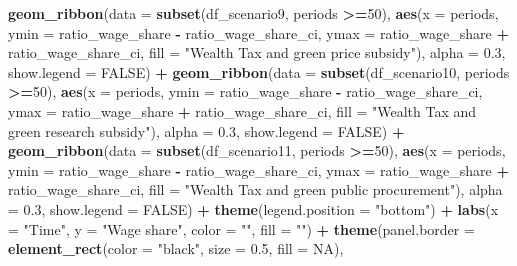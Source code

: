 \documentclass[
]{article}
\newenvironment{Shaded}{\begin{snugshade}}{\end{snugshade}}
\newcommand{\AttributeTok}[1]{\textcolor[rgb]{0.13,0.29,0.53}{#1}}
\newcommand{\ConstantTok}[1]{\textcolor[rgb]{0.56,0.35,0.01}{#1}}
\newcommand{\DecValTok}[1]{\textcolor[rgb]{0.00,0.00,0.81}{#1}}
\newcommand{\FloatTok}[1]{\textcolor[rgb]{0.00,0.00,0.81}{#1}}
\newcommand{\FunctionTok}[1]{\textcolor[rgb]{0.13,0.29,0.53}{\textbf{#1}}}
\newcommand{\NormalTok}[1]{#1}
\newcommand{\SpecialCharTok}[1]{\textcolor[rgb]{0.81,0.36,0.00}{\textbf{#1}}}
\newcommand{\StringTok}[1]{\textcolor[rgb]{0.31,0.60,0.02}{#1}}
\begin{document}
\begin{Shaded}
\begin{Highlighting}[]
  \FunctionTok{geom\_ribbon}\NormalTok{(}\AttributeTok{data =} \FunctionTok{subset}\NormalTok{(df\_scenario9, periods }\SpecialCharTok{\textgreater{}=}\DecValTok{50}\NormalTok{), }\FunctionTok{aes}\NormalTok{(}\AttributeTok{x =}\NormalTok{ periods, }\AttributeTok{ymin =}\NormalTok{ ratio\_wage\_share }\SpecialCharTok{{-}}\NormalTok{ ratio\_wage\_share\_ci, }\AttributeTok{ymax =}\NormalTok{ ratio\_wage\_share }\SpecialCharTok{+}\NormalTok{ ratio\_wage\_share\_ci, }\AttributeTok{fill =} \StringTok{"Wealth Tax and green price subsidy"}\NormalTok{), }\AttributeTok{alpha =} \FloatTok{0.3}\NormalTok{, }\AttributeTok{show.legend =} \ConstantTok{FALSE}\NormalTok{) }\SpecialCharTok{+}
  \FunctionTok{geom\_ribbon}\NormalTok{(}\AttributeTok{data =} \FunctionTok{subset}\NormalTok{(df\_scenario10, periods }\SpecialCharTok{\textgreater{}=}\DecValTok{50}\NormalTok{), }\FunctionTok{aes}\NormalTok{(}\AttributeTok{x =}\NormalTok{ periods, }\AttributeTok{ymin =}\NormalTok{ ratio\_wage\_share }\SpecialCharTok{{-}}\NormalTok{ ratio\_wage\_share\_ci, }\AttributeTok{ymax =}\NormalTok{ ratio\_wage\_share }\SpecialCharTok{+}\NormalTok{ ratio\_wage\_share\_ci, }\AttributeTok{fill =} \StringTok{"Wealth Tax and green research subsidy"}\NormalTok{), }\AttributeTok{alpha =} \FloatTok{0.3}\NormalTok{, }\AttributeTok{show.legend =} \ConstantTok{FALSE}\NormalTok{) }\SpecialCharTok{+}
  \FunctionTok{geom\_ribbon}\NormalTok{(}\AttributeTok{data =} \FunctionTok{subset}\NormalTok{(df\_scenario11, periods }\SpecialCharTok{\textgreater{}=}\DecValTok{50}\NormalTok{), }\FunctionTok{aes}\NormalTok{(}\AttributeTok{x =}\NormalTok{ periods, }\AttributeTok{ymin =}\NormalTok{ ratio\_wage\_share }\SpecialCharTok{{-}}\NormalTok{ ratio\_wage\_share\_ci, }\AttributeTok{ymax =}\NormalTok{ ratio\_wage\_share }\SpecialCharTok{+}\NormalTok{ ratio\_wage\_share\_ci, }\AttributeTok{fill =} \StringTok{"Wealth Tax and green public procurement"}\NormalTok{), }\AttributeTok{alpha =} \FloatTok{0.3}\NormalTok{, }\AttributeTok{show.legend =} \ConstantTok{FALSE}\NormalTok{) }\SpecialCharTok{+}
  \FunctionTok{theme}\NormalTok{(}\AttributeTok{legend.position =} \StringTok{"bottom"}\NormalTok{) }\SpecialCharTok{+}
  \FunctionTok{labs}\NormalTok{(}\AttributeTok{x =} \StringTok{"Time"}\NormalTok{, }\AttributeTok{y =} \StringTok{"Wage share"}\NormalTok{, }\AttributeTok{color =} \StringTok{""}\NormalTok{, }\AttributeTok{fill =} \StringTok{""}\NormalTok{) }\SpecialCharTok{+}
  \FunctionTok{theme}\NormalTok{(}\AttributeTok{panel.border =} \FunctionTok{element\_rect}\NormalTok{(}\AttributeTok{color =} \StringTok{"black"}\NormalTok{, }\AttributeTok{size =} \FloatTok{0.5}\NormalTok{, }\AttributeTok{fill =} \ConstantTok{NA}\NormalTok{),}

\end{Highlighting}
\end{Shaded}
\end{document}
